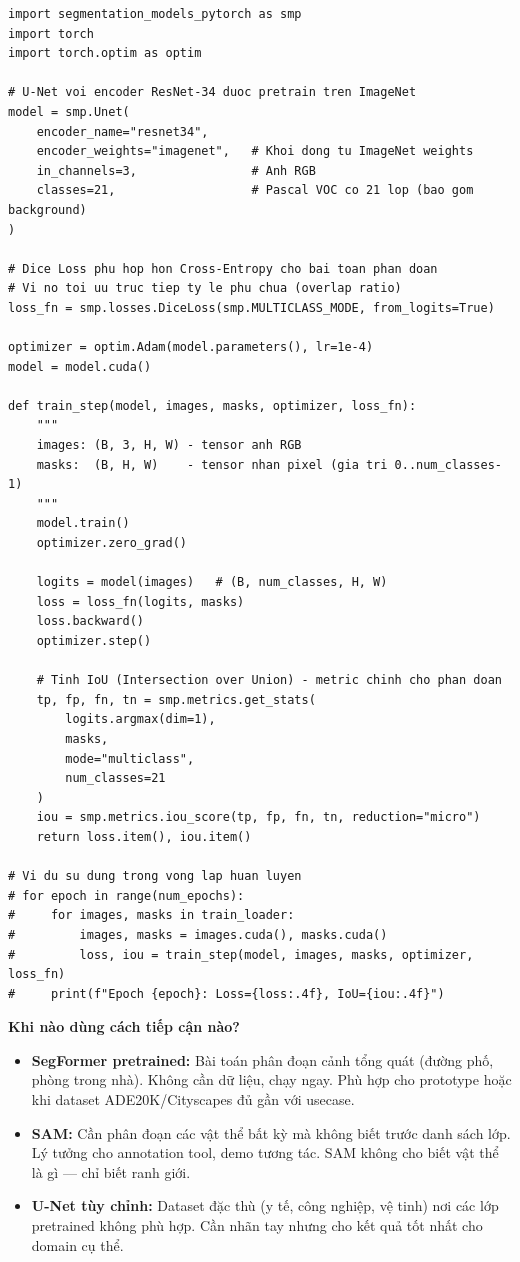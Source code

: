 \begin{verbatim}
import segmentation_models_pytorch as smp
import torch
import torch.optim as optim

# U-Net voi encoder ResNet-34 duoc pretrain tren ImageNet
model = smp.Unet(
    encoder_name="resnet34",
    encoder_weights="imagenet",   # Khoi dong tu ImageNet weights
    in_channels=3,                # Anh RGB
    classes=21,                   # Pascal VOC co 21 lop (bao gom background)
)

# Dice Loss phu hop hon Cross-Entropy cho bai toan phan doan
# Vi no toi uu truc tiep ty le phu chua (overlap ratio)
loss_fn = smp.losses.DiceLoss(smp.MULTICLASS_MODE, from_logits=True)

optimizer = optim.Adam(model.parameters(), lr=1e-4)
model = model.cuda()

def train_step(model, images, masks, optimizer, loss_fn):
    """
    images: (B, 3, H, W) - tensor anh RGB
    masks:  (B, H, W)    - tensor nhan pixel (gia tri 0..num_classes-1)
    """
    model.train()
    optimizer.zero_grad()

    logits = model(images)   # (B, num_classes, H, W)
    loss = loss_fn(logits, masks)
    loss.backward()
    optimizer.step()

    # Tinh IoU (Intersection over Union) - metric chinh cho phan doan
    tp, fp, fn, tn = smp.metrics.get_stats(
        logits.argmax(dim=1),
        masks,
        mode="multiclass",
        num_classes=21
    )
    iou = smp.metrics.iou_score(tp, fp, fn, tn, reduction="micro")
    return loss.item(), iou.item()

# Vi du su dung trong vong lap huan luyen
# for epoch in range(num_epochs):
#     for images, masks in train_loader:
#         images, masks = images.cuda(), masks.cuda()
#         loss, iou = train_step(model, images, masks, optimizer, loss_fn)
#     print(f"Epoch {epoch}: Loss={loss:.4f}, IoU={iou:.4f}")
\end{verbatim}

\begin{mdframed}[style=infobox]
\textbf{Khi nào dùng cách tiếp cận nào?}

\begin{itemize}
    \item \textbf{SegFormer pretrained:} Bài toán phân đoạn cảnh tổng quát (đường phố, phòng trong nhà). Không cần dữ liệu, chạy ngay. Phù hợp cho prototype hoặc khi dataset ADE20K/Cityscapes đủ gần với usecase.

    \item \textbf{SAM:} Cần phân đoạn các vật thể bất kỳ mà không biết trước danh sách lớp. Lý tưởng cho annotation tool, demo tương tác. SAM không cho biết vật thể là gì --- chỉ biết ranh giới.

    \item \textbf{U-Net tùy chỉnh:} Dataset đặc thù (y tế, công nghiệp, vệ tinh) nơi các lớp pretrained không phù hợp. Cần nhãn tay nhưng cho kết quả tốt nhất cho domain cụ thể.
\end{itemize}
\end{mdframed}
